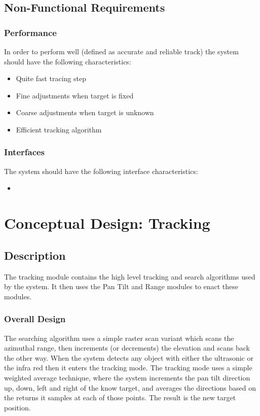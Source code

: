 \documentclass[]{report}
\begin{document}
\subsection{Non-Functional Requirements}
\subsubsection{Performance}
In order to perform well (defined as accurate and reliable track) the system should have the following characteristics:
\begin{itemize}
	\item Quite fast tracing step
	\item Fine adjustments when target is fixed
	\item Coarse adjustments when target is unknown
	\item Efficient tracking algorithm
\end{itemize}

\subsubsection{Interfaces}
The system should have the following interface characteristics:
\begin{itemize}
	\item
\end{itemize}

\section{Conceptual Design: Tracking}
\subsection{Description}
The tracking module contains the high level tracking and search algorithms used by the system. It then uses the Pan Tilt and Range modules to enact these modules.

\subsubsection{Overall Design}
The searching algorithm uses a simple raster scan variant which scans the azimuthal range, then increments (or decrements) the elevation and scans back the other way. When the system detects any object with either the ultrasonic or the infra red then it enters the tracking mode. \newline
The tracking mode uses a simple weighted average technique, where the system increments the pan tilt direction up, down, left and right of the know target, and averages the directions based on the returns it samples at each of those points. The result is the new target position.
\end{document}
